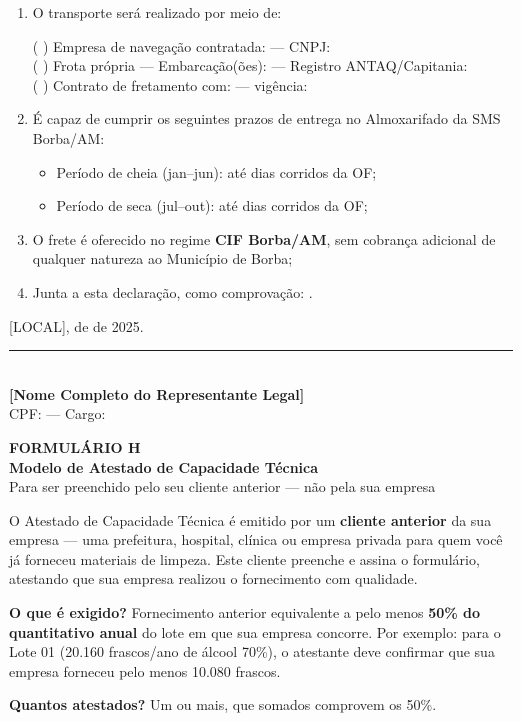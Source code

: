 \documentclass[12pt,a4paper]{article}
\newcommand{\formulario}[3]{%
  \clearpage
  \begin{tcolorbox}[enhanced,colback=navy,colframe=navy,arc=6pt,
    left=14pt,right=14pt,top=10pt,bottom=10pt]
    \color{white}
    {\large\bfseries FORMULÁRIO #1}\\[4pt]
    {\Large\bfseries #2}\\[4pt]
    {\small\color{ltblue} #3}
  \end{tcolorbox}
  \vspace{0.3cm}}
\newcommand{\blank}[1]{\underline{\hspace{#1}}}
\newcommand{\exercicio}{2025}
\begin{document}
\begin{enumerate}
  \item O transporte será realizado por meio de:

    ( ) Empresa de navegação contratada:
    \textbf{\blank{5cm}} --- CNPJ: \blank{3cm}\\[4pt]
    ( ) Frota própria --- Embarcação(ões): \blank{4cm} ---
    Registro ANTAQ/Capitania: \blank{3cm}\\[4pt]
    ( ) Contrato de fretamento com: \blank{5cm} --- vigência: \blank{2cm}

  \item É capaz de cumprir os seguintes prazos de entrega no Almoxarifado
    da SMS Borba/AM:
    \begin{itemize}
      \item Período de cheia (jan--jun): até \blank{1cm} dias corridos da OF;
      \item Período de seca (jul--out): até \blank{1cm} dias corridos da OF;
    \end{itemize}

  \item O frete é oferecido no regime \textbf{CIF Borba/AM}, sem cobrança
    adicional de qualquer natureza ao Município de Borba;

  \item Junta a esta declaração, como comprovação: \blank{6cm}.
\end{enumerate}

\vspace{1.2cm}
\begin{center}
  [LOCAL], \blank{0.8cm} de \blank{3cm} de \exercicio.\\[1.0cm]
  \rule{9cm}{0.5pt}\\[3pt]
  \textbf{[Nome Completo do Representante Legal]}\\
  \small CPF: \blank{3cm} --- Cargo: \blank{3cm}
\end{center}

\formulario{H}{Modelo de Atestado de Capacidade Técnica}{%
  Para ser preenchido pelo seu cliente anterior --- não pela sua empresa}

\begin{dicabox}
\small
O Atestado de Capacidade Técnica é emitido por um \textbf{cliente anterior}
da sua empresa --- uma prefeitura, hospital, clínica ou empresa privada para
quem você já forneceu materiais de limpeza. Este cliente preenche e assina
o formulário, atestando que sua empresa realizou o fornecimento com qualidade.

\medskip
\textbf{O que é exigido?} Fornecimento anterior equivalente a pelo menos
\textbf{50\% do quantitativo anual} do lote em que sua empresa concorre.
Por exemplo: para o Lote 01 (20.160 frascos/ano de álcool 70\%), o atestante
deve confirmar que sua empresa forneceu pelo menos 10.080 frascos.

\medskip
\textbf{Quantos atestados?} Um ou mais, que somados comprovem os 50\%.
\end{dicabox}
\end{document}
